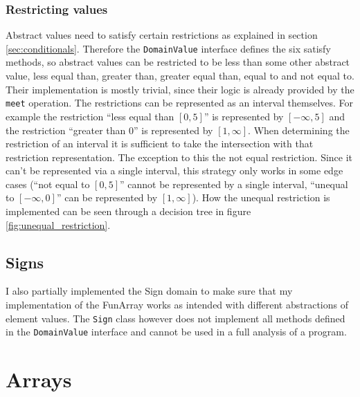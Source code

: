 \subsubsection{Restricting values}\label{sec:scalarvariables:intervals:restriction}

Abstract values need to satisfy certain restrictions as explained in section \ref{sec:conditionals}. Therefore the \texttt{DomainValue} interface defines the six satisfy methods, so abstract values can be restricted to be less than some other abstract value, less equal than, greater than, greater equal than, equal to and not equal to. Their implementation is mostly trivial, since their logic is already provided by the \texttt{meet} operation. The restrictions can be represented as an interval themselves. For example the restriction ``less equal than $[0,5]$'' is represented by $[-\infty,5]$ and the restriction ``greater than $0$'' is represented by $[1,\infty]$. When determining the restriction of an interval it is sufficient to take the intersection with that restriction representation. The exception to this the not equal restriction. Since it can't be represented via a single interval, this strategy only works in some edge cases (``not equal to $[0,5]$'' cannot be represented by a single interval, ``unequal to $[-\infty,0]$'' can be represented by $[1,\infty]$). How the unequal restriction is implemented can be seen through a decision tree in figure \ref{fig:unequal_restriction}.



\subsection{Signs}
I also partially implemented the Sign domain to make sure that my implementation of the FunArray works as intended with different abstractions of element values. The \texttt{Sign} class however does not implement all methods defined in the \texttt{DomainValue} interface and cannot be used in a full analysis of a program.






\section{Arrays}

